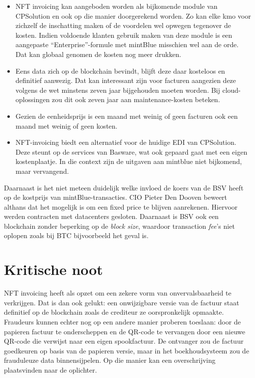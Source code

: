 \begin{itemize}
	\item NFT invoicing kan aangeboden worden als bijkomende module van CPSolution en ook op die manier doorgerekend worden. Zo kan elke kmo voor zichzelf de inschatting maken of de voordelen wel opwegen tegenover de kosten. Indien voldoende klanten gebruik maken van deze module is een aangepaste ``Enterprise''-formule met mintBlue misschien wel aan de orde. Dat kan globaal genomen de kosten nog meer drukken.
	\item Eens data zich op de blockchain bevindt, blijft deze daar kosteloos en definitief aanwezig. Dat kan interessant zijn voor facturen aangezien deze volgens de wet minstens zeven jaar bijgehouden moeten worden. Bij cloud-oplossingen zou dit ook zeven jaar aan maintenance-kosten beteken. 
	\item Gezien de eenheidsprijs is een maand met weinig of geen facturen ook een maand met weinig of geen kosten. 
	\item NFT-invoicing biedt een alternatief voor de huidige EDI van CPSolution. Deze steunt op de services van Basware, wat ook gepaard gaat met een eigen kostenplaatje. In die context zijn de uitgaven aan mintblue niet bijkomend, maar vervangend.
\end{itemize}

Daarnaast is het niet meteen duidelijk welke invloed de koers van de BSV heeft op de kostprijs van mintBlue-transacties. CIO Pieter Den Dooven beweert althans dat het mogelijk is om een fixed price te blijven aanrekenen. Hiervoor werden contracten met datacenters gesloten. Daarnaast is BSV ook een blockchain zonder beperking op de \textit{block size}, waardoor transaction \textit{fee}'s niet oplopen zoals bij BTC bijvoorbeeld het geval is\autocite{MNP2021}.


\section{Kritische noot}
\label{sec:kritische-noot}

NFT invoicing heeft als opzet om een zekere vorm van onvervalsbaarheid te verkrijgen. Dat is dan ook gelukt: een onwijzigbare versie van de factuur staat definitief op de blockchain zoals de crediteur ze oorspronkelijk opmaakte. Fraudeurs kunnen echter nog op een andere manier proberen toeslaan: door de papieren factuur te onderscheppen en de QR-code te vervangen door een nieuwe QR-code die verwijst naar een eigen spookfactuur. De ontvanger zou de factuur goedkeuren op basis van de papieren versie, maar in het boekhoudsysteem zou de frauduleuze data binnensijpelen. Op die manier kan een overschrijving plaatsvinden naar de oplichter.

